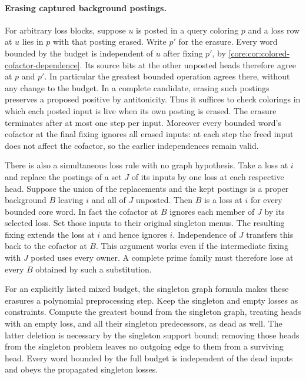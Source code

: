 \paragraph{Erasing captured background postings.}
For arbitrary loss blocks, suppose $u$ is posted in a
query coloring $p$ and a loss row at $u$ lies in $p$
with that posting erased. Write $p'$ for the erasure.
Every word bounded by the budget is independent of
$u$ after fixing $p'$, by
\cref{core:cor:colored-cofactor-dependence}.
Its source bits at the other unposted heads therefore
agree at $p$ and $p'$. In particular the greatest
bounded operation agrees there, without any change
to the budget. In a complete candidate, erasing such
postings preserves a proposed positive by antitonicity.
Thus it suffices to check colorings in which each
posted input is live when its own posting is erased.
The erasure terminates after at most one step per
input. Moreover every bounded word's cofactor at the
final fixing ignores all erased inputs: at each step
the freed input does not affect the cofactor, so the
earlier independences remain valid.

There is also a simultaneous loss rule with no graph
hypothesis. Take a loss at $i$ and replace the postings
of a set $J$ of its inputs by one loss at each respective
head. Suppose the union of the replacements and the kept
postings is a proper background $B$ leaving $i$ and all
of $J$ unposted. Then $B$ is a loss at $i$ for every
bounded core word. In fact the cofactor at $B$ ignores
each member of $J$ by its selected loss. Set those
inputs to their original singleton menus. The resulting
fixing extends the loss at $i$ and hence ignores $i$.
Independence of $J$ transfers this back to the cofactor
at $B$. This argument works even if the intermediate
fixing with $J$ posted uses every owner. A complete
prime family must therefore lose at every $B$ obtained
by such a substitution.

For an explicitly listed mixed budget, the singleton
graph formula makes these erasures a polynomial
preprocessing step. Keep the singleton and empty
losses as constraints. Compute the greatest bound
from the singleton graph, treating heads with an
empty loss, and all their singleton predecessors,
as dead as well. The latter deletion is necessary
by the singleton support bound; removing those heads
from the singleton problem leaves no outgoing edge
to them from a surviving head. Every word bounded
by the full budget is independent of the dead
inputs and obeys the propagated singleton losses.

